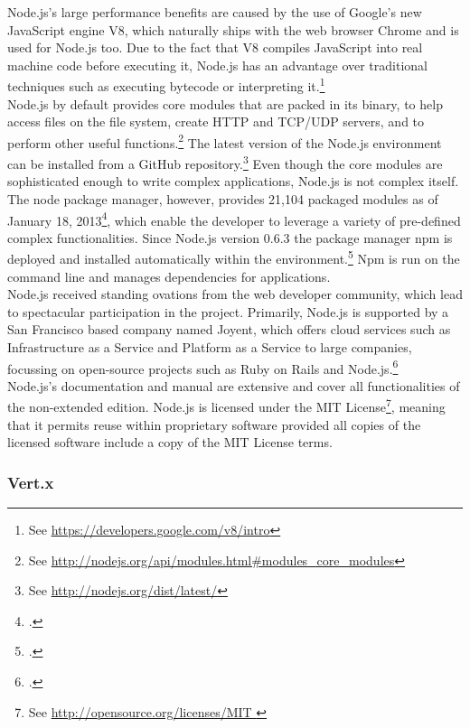 Node.js's large performance benefits are caused by the use of Google's new JavaScript engine V8, which naturally ships with the web browser Chrome and is used for Node.js too. Due to the fact that V8 compiles JavaScript into
real machine code before executing it, Node.js has an advantage over 
traditional techniques such as executing bytecode or interpreting it.\footnote{See \url{https://developers.google.com/v8/intro}}
\\
Node.js by default provides core modules that are packed in its binary, to help
access files on the file system, create HTTP and TCP/UDP servers, and to perform
other useful functions.\footnote{See \url{http://nodejs.org/api/modules.html\#modules_core_modules}}
The latest version of the Node.js environment can be installed from a GitHub repository.\footnote{See \url{http://nodejs.org/dist/latest/}}
Even though the core modules are sophisticated enough to write complex applications, Node.js is not complex itself.
The node package manager, however, provides 21,104 packaged modules as of
January 18, 2013\footcite[Cf.][]{node_packages}, which enable the developer to
leverage a variety of pre-defined complex functionalities.
Since Node.js version 0.6.3 the package manager npm is deployed and installed
automatically within the environment.\footcite[Cf.]{blog_nodejs_2011} Npm is run on the command
line and manages dependencies for applications.\\
Node.js received standing ovations from the web developer community, which lead
to spectacular participation in the project. Primarily, Node.js is supported by
a San Francisco based company named Joyent, which offers cloud services such as
Infrastructure as a Service and Platform as a Service to large companies,
focussing on open-source projects such as Ruby on Rails and
Node.js.\footcite[Cf.][]{jaxenter_2010}\\
Node.js's documentation and manual are extensive and cover all functionalities
of the non-extended edition.
Node.js is licensed under the MIT License\footnote{See
\url{http://opensource.org/licenses/MIT }}, meaning that it permits reuse within
proprietary software provided all copies of the licensed software include a copy
of the MIT License terms.\\



\subsubsection{Vert.x}
\label{Vert.x}

